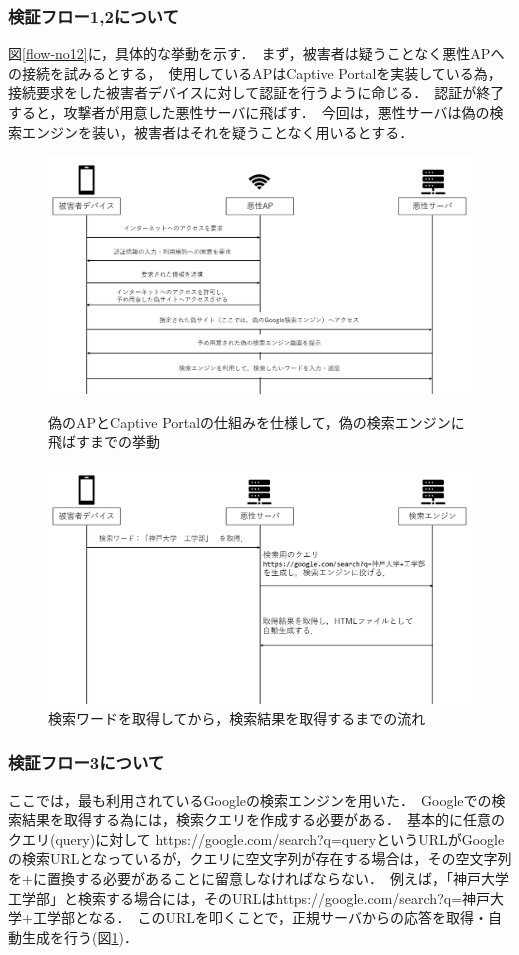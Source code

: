 \documentclass[dvipdfmx,twocolumn]{jsarticle}
\begin{document}
            \subsubsection{検証フロー1,2について}
                図\ref{flow-no12}に，具体的な挙動を示す．\
                まず，被害者は疑うことなく悪性APへの接続を試みるとする，\
                使用しているAPはCaptive Portalを実装している為，接続要求をした被害者デバイスに対して認証を行うように命じる．\
                認証が終了すると，攻撃者が用意した悪性サーバに飛ばす．\
                今回は，悪性サーバは偽の検索エンジンを装い，被害者はそれを疑うことなく用いるとする．\
                \begin{figure}[t]
                    \centering
                    \includegraphics[width=12cm]{img/vc-vf-1-2.png}
                    \caption{偽のAPとCaptive Portalの仕組みを仕様して，偽の検索エンジンに飛ばすまでの挙動}
                    \label{flow-no12}
                    \includegraphics[width=12cm]{img/vc-vf-3.png}
                    \caption{検索ワードを取得してから，検索結果を取得するまでの流れ}
                    \label{flow-no3} 
                \end{figure}
            \subsubsection{検証フロー3について}
                ここでは，最も利用されているGoogleの検索エンジンを用いた．\
                Googleでの検索結果を取得する為には，検索クエリを作成する必要がある．\
                基本的に任意のクエリ(query)に対して https://google.com/search?q=queryというURLがGoogleの検索URLとなっているが，クエリに空文字列が存在する場合は，その空文字列を+に置換する必要があることに留意しなければならない．\
                例えば，「神戸大学　工学部」と検索する場合には，そのURLはhttps://google.com/search?q=神戸大学+工学部となる．\
                このURLを叩くことで，正規サーバからの応答を取得・自動生成を行う(図\ref{flow-no3})．\\
\end{document}

